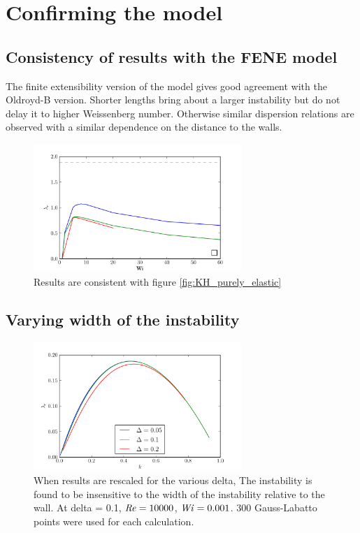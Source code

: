 \documentclass{jfm}
\newcommand\Wi{\mbox{\textit{Wi}}}
\newcommand\Rey{\mbox{\textit{Re}}}  %
\begin{document}
\section{Confirming the model}

\subsection{Consistency of results with the FENE model}

The finite extensibility version of the model gives good agreement with the Oldroyd-B version. Shorter lengths bring about a larger instability but do not delay it to higher Weissenberg number. Otherwise similar dispersion relations are observed with a similar dependence on the distance to the walls.

\begin{figure}
    \centering
    \includegraphics[width=0.7\textwidth]{FENE_low_Re_vary_Wi}
    \caption{Results are consistent with figure \ref{fig:KH_purely_elastic}}
    \label{fig:FENE_low_Re}
\end{figure}

\subsection{Varying width of the instability}

\begin{figure}
    \centering
    \includegraphics[width=0.7\textwidth]{high_Re_vary_delta}
    \caption{When results are rescaled for the various delta, The instability is found to be insensitive to the width of the instability relative to the wall. At delta = 0.1, $\Rey = 10000$, $\Wi = 0.001$. 300 Gauss-Labatto points were used for each calculation.}
    \label{fig:delta_dispersion}
\end{figure}
\end{document}
